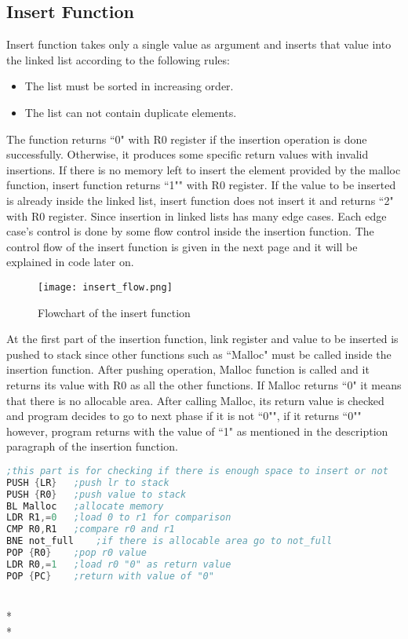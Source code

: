 \documentclass[pdftex,12pt,a4paper]{article}
\begin{document}
\subsection{Insert Function}
Insert function takes only a single value as argument and inserts that value into the linked list according to the following rules:
\begin{itemize}
    \item The list must be sorted in increasing order.
    \item The list can not contain duplicate elements.
\end{itemize}
The function returns ``0" with R0 register if the insertion operation is done successfully. Otherwise, it produces some specific return values with invalid insertions. If there is no memory left to insert the element provided by the malloc function, insert function returns ``1"" with R0 register. If the value to be inserted is already inside the linked list, insert function does not insert it and returns ``2" with R0 register. Since insertion in linked lists has many edge cases. Each edge case's control is done by some flow control inside the insertion function. The control flow of the insert function is given in the next page and it will be explained in code later on.
\begin{figure}[H]
	\centering
	\texttt{[image: insert\_flow.png]}	
	\caption{Flowchart of the insert function\cite{ref1}}
	\label{insert_flow}
\end{figure}
\quad At the first part of the insertion function, link register and value to be inserted is pushed to stack since other functions such as ``Malloc" must be called inside the insertion function. After pushing operation, Malloc function is called and it returns its value with R0 as all the other functions. If Malloc returns ``0" it means that there is no allocable area. After calling Malloc, its return value is checked and program decides to go to next phase if it is not ``0"", if it returns ``0"" however, program returns with the value of ``1" as mentioned in the description paragraph of the insertion function.
\begin{lstlisting}[language=Assembler]
;this part is for checking if there is enough space to insert or not
PUSH {LR}   ;push lr to stack
PUSH {R0}	;push value to stack
BL Malloc	;allocate memory
LDR R1,=0	;load 0 to r1 for comparison
CMP R0,R1	;compare r0 and r1
BNE not_full	;if there is allocable area go to not_full
POP {R0}    ;pop r0 value
LDR R0,=1	;load r0 "0" as return value
POP {PC}	;return with value of "0"
\end{lstlisting}\\*\\*
\end{document}
